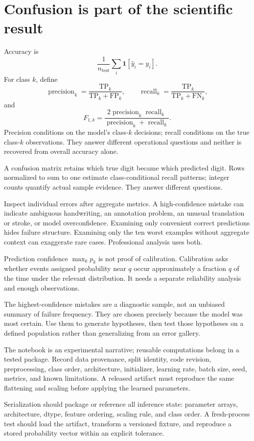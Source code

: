 \section{Confusion is part of the scientific result}

Accuracy is
\[
  \frac{1}{n_{\mathrm{test}}}
  \sum_i\mathbf1[\widehat y_i=y_i].
\]
For class $k$, define
\[
  \operatorname{precision}_k
  =\frac{\mathrm{TP}_k}{\mathrm{TP}_k+\mathrm{FP}_k},
  \qquad
  \operatorname{recall}_k
  =\frac{\mathrm{TP}_k}{\mathrm{TP}_k+\mathrm{FN}_k},
\]
and
\[
  F_{1,k}
  =\frac{2\operatorname{precision}_k\operatorname{recall}_k}
  {\operatorname{precision}_k+\operatorname{recall}_k}.
\]
Precision conditions on the model's class-$k$ decisions; recall conditions on
the true class-$k$ observations. They answer different operational questions
and neither is recovered from overall accuracy alone.

A confusion matrix retains which true digit became which predicted digit.
Rows normalized to sum to one estimate class-conditional recall patterns;
integer counts quantify actual sample evidence. They answer different
questions.

Inspect individual errors after aggregate metrics. A high-confidence mistake
can indicate ambiguous handwriting, an annotation problem, an unusual
translation or stroke, or model overconfidence. Examining only convenient
correct predictions hides failure structure. Examining only the ten worst
examples without aggregate context can exaggerate rare cases. Professional
analysis uses both.

Prediction confidence $\max_k p_k$ is not proof of calibration. Calibration
asks whether events assigned probability near $q$ occur approximately a
fraction $q$ of the time under the relevant distribution. It needs a separate
reliability analysis and enough observations.

The highest-confidence mistakes are a diagnostic sample, not an unbiased
summary of failure frequency. They are chosen precisely because the model was
most certain. Use them to generate hypotheses, then test those hypotheses on a
defined population rather than generalizing from an error gallery.

\begin{professionalbox}
The notebook is an experimental narrative; reusable computations belong in a
tested package. Record data provenance, split identity, code revision,
preprocessing, class order, architecture, initializer, learning rate, batch
size, seed, metrics, and known limitations. A released artifact must reproduce
the same flattening and scaling before applying the learned parameters.

Serialization should package or reference all inference state: parameter
arrays, architecture, dtype, feature ordering, scaling rule, and class order.
A fresh-process test should load the artifact, transform a versioned fixture,
and reproduce a stored probability vector within an explicit tolerance.
\end{professionalbox}

